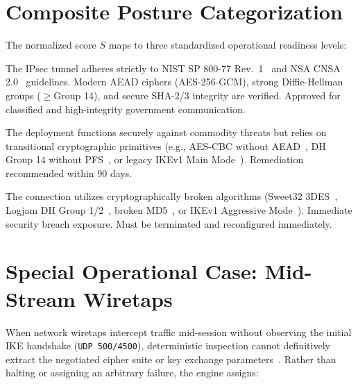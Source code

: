 \documentclass[11pt,a4paper]{article}
\begin{document}
\section{Composite Posture Categorization}
The normalized score $S$ maps to three standardized operational readiness levels:

\begin{tcolorbox}[colback=green!5!white,colframe=green!60!black,title=\textbf{PASS -- COMPLIANT / SECURE DEFENSE POSTURE ($85 \le S \le 100$)}]
The IPsec tunnel adheres strictly to NIST SP 800-77 Rev.~1~\cite{nist800-77r1} and NSA CNSA 2.0~\cite{cnsa2} guidelines. Modern AEAD ciphers (AES-256-GCM), strong Diffie-Hellman groups ($\ge$Group 14), and secure SHA-2/3 integrity are verified. Approved for classified and high-integrity government communication.
\end{tcolorbox}

\begin{tcolorbox}[colback=yellow!10!white,colframe=orange!80!black,title=\textbf{WARNING -- DEPRECATED PRIMITIVES / TRANSITIONAL POSTURE ($60 \le S < 85$)}]
The deployment functions securely against commodity threats but relies on transitional cryptographic primitives (e.g., AES-CBC without AEAD~\cite{vaudenay2002}, DH Group 14 without PFS~\cite{nist800-57p1r5}, or legacy IKEv1 Main Mode~\cite{rfc9395}). Remediation recommended within 90 days.
\end{tcolorbox}

\begin{tcolorbox}[colback=red!5!white,colframe=red!70!black,title=\textbf{CRITICAL FAIL -- ACTIVE EXPLOIT RISK ($0 \le S < 60$)}]
The connection utilizes cryptographically broken algorithms (Sweet32 3DES~\cite{sweet32}, Logjam DH Group 1/2~\cite{logjam}, broken MD5~\cite{nist800-131ar2}, or IKEv1 Aggressive Mode~\cite{rfc9395}). Immediate security breach exposure. Must be terminated and reconfigured immediately.
\end{tcolorbox}

\section{Special Operational Case: Mid-Stream Wiretaps}
When network wiretaps intercept traffic mid-session without observing the initial IKE handshake (\texttt{UDP 500/4500}), deterministic inspection cannot definitively extract the negotiated cipher suite or key exchange parameters~\cite{rfc4303, nist800-77r1}. Rather than halting or assigning an arbitrary failure, the engine assigns:
\end{document}
